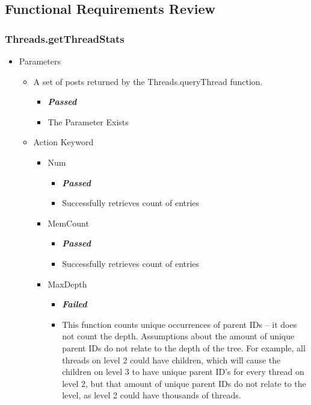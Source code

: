 \subsection{Functional Requirements Review}
\subsubsection{Threads.getThreadStats}

\begin{itemize}
	\item Parameters
		\begin{itemize}
			\item A set of posts returned by the Threads.queryThread function.
			\begin{itemize}
				\item \color{green}
\textbf{\small \emph{Passed}} \\
				\color{black} \item The Parameter Exists
			\end{itemize}
			\item Action Keyword 
			\begin{itemize}
				\item Num
				\begin{itemize}
					\item \color{green}
\textbf{\small \emph{Passed}} \\\color{black}
					\item Successfully retrieves count of entries
				\end{itemize}
				\item MemCount
				\begin{itemize}
					\item \color{green}
\textbf{\small \emph{Passed}} \\ \color{black}
					\item Successfully retrieves count of entries
				\end{itemize}
				\item MaxDepth
				\begin{itemize}
					\item \color{red}
\textbf{\small \emph{Failed}} \\\color{black}
					\item This function counts unique occurrences of parent IDs – it does not count the depth. Assumptions about the amount of unique parent IDs do not relate to the depth of the tree. For example, all threads on level 2 could have children, which will cause the children on level 3 to have unique parent ID’s for every thread on level 2, but that amount of unique parent IDs do not relate to the level, as level 2 could have thousands of threads.

\end{itemize}
\end{itemize}
\end{itemize}
\end{itemize}
